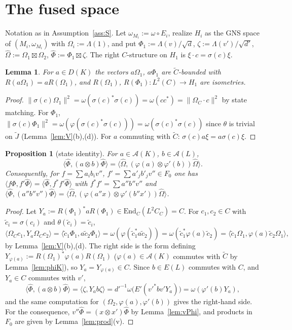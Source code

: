 \documentclass[11pt]{article}
\newtheorem{lemma}[theorem]{Lemma}
\newtheorem{proposition}[theorem]{Proposition}
\theoremstyle{definition}
\theoremstyle{remark}
\newcommand{\cA}{\mathcal A}
\newcommand{\Om}{\Omega}
\newcommand{\Lam}{\Lambda}
\newcommand{\ph}{\varphi}
\newcommand{\fus}{\boxtimes}
\newcommand{\ip}[2]{\langle #1,#2\rangle}
\begin{document}
\section{The fused space}\label{sec:state}

Notation as in Assumption~\ref{ass:S}. Let $\omega_{M_i}:=\omega\circ E_i$, realize $H_i$ as the GNS space of $(M_i,\omega_{M_i})$ with $\Om_i:=\Lam(1)$, and put $\Phi_1:=\Lam(v)/\sqrt d$, $\zeta:=\Lam(v')/\sqrt{d'}$, $\hat\Om:=\Om_1\fus\Om_2$, $\hat\Phi:=\Phi_1\fus\zeta$. The right $C$-structure on $H_1$ is $\xi\cdot c=\sigma(c)\xi$.

\begin{lemma}\label{lem:bounded}
For $a\in D(K)$ the vectors $a\Om_1$, $a\Phi_1$ are $\tilde C$-bounded with $R(a\Om_1)=aR(\Om_1)$, and $R(\Om_1)$, $R(\Phi_1)\colon L^2(C)\to H_1$ are isometries.
\end{lemma}
\begin{proof}
$\|\sigma(c)\Om_1\|^2=\omega(\sigma(c)^*\sigma(c))=\omega(cc^*)=\|\Om_C\cdot c\|^2$ by state matching. For $\Phi_1$, $\|\sigma(c)\Phi_1\|^2=\omega(\ph(\sigma(c)^*\sigma(c)))=\omega(\sigma(c)^*\sigma(c))$ since $\theta$ is trivial on $\tilde J$ (Lemma~\ref{lem:V}(b),(d)). For $a$ commuting with $\tilde C$: $\sigma(c)a\xi=a\sigma(c)\xi$.
\end{proof}

\begin{proposition}[state identity]\label{prop:state}
For $a\in\cA(K)$, $b\in\cA(L)$,
\[
\ip{\hat\Phi}{(a\otimes b)\hat\Phi}=\ip{\hat\Om}{(\ph(a)\otimes\ph'(b))\hat\Om}.
\]
Consequently, for $f=\sum a_ib_iv''$, $f'=\sum a'_jb'_jv''\in F_0$ one has $\ip{f\hat\Phi}{f'\hat\Phi}=\ip{\hat\Phi}{f^*f'\hat\Phi}$ with $f^*f'=\sum a''b''v''$ and $\ip{\hat\Phi}{(a''b''v'')\hat\Phi}=\ip{\hat\Om}{(\ph(a''x)\otimes\ph'(b''x'))\hat\Om}$.
\end{proposition}
\begin{proof}
Let $Y_a:=R(\Phi_1)^*aR(\Phi_1)\in\mathrm{End}_C(L^2C_C)=C$. For $c_1,c_2\in C$ with $\tilde c_i=\sigma(c_i)$ and $\theta(\tilde c_i)=\tilde c_i$,
\[
\ip{\Om_Cc_1}{Y_a\Om_Cc_2}=\ip{\tilde c_1\Phi_1}{a\tilde c_2\Phi_1}=\omega(\ph(\tilde c_1^*a\tilde c_2))=\omega(\tilde c_1^*\ph(a)\tilde c_2)=\ip{\tilde c_1\Om_1}{\ph(a)\tilde c_2\Om_1},
\]
by Lemma~\ref{lem:V}(b),(d). The right side is the form defining $Y_{\ph(a)}:=R(\Om_1)^*\ph(a)R(\Om_1)$ ($\ph(a)\in\cA(K)$ commutes with $\tilde C$ by Lemma~\ref{lem:phiK}), so $Y_a=Y_{\ph(a)}\in C$. Since $b\in E(L)$ commutes with $C$, and $Y_a\in C$ commutes with $v'$,
\[
\ip{\hat\Phi}{(a\otimes b)\hat\Phi}=\ip{\zeta}{Y_ab\zeta}=d'^{-1}\omega\big(E'(v'^*bv'Y_a)\big)=\omega(\ph'(b)Y_a),
\]
and the same computation for $(\Om_2,\ph(a),\ph'(b))$ gives the right-hand side. For the consequence, $v''\hat\Phi=(x\otimes x')\hat\Phi$ by Lemma~\ref{lem:vPhi}, and products in $F_0$ are given by Lemma~\ref{lem:prod}(v).
\end{proof}
\end{document}
